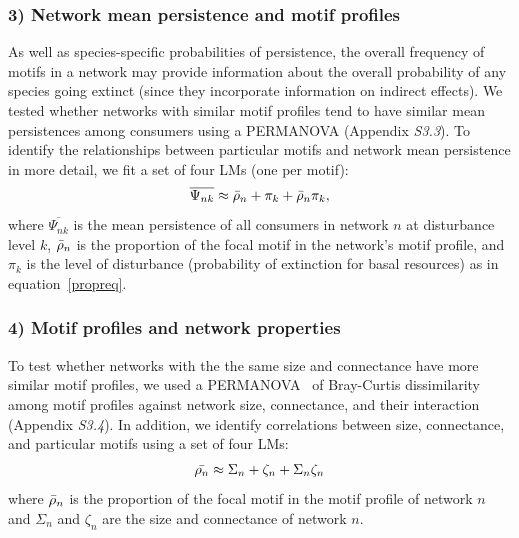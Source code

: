 \documentclass[12pt]{article}
\begin{document}
\begin{spacing}{2.0}
            
        \subsubsection*{3) Network mean persistence and motif profiles}

            As well as species-specific probabilities of persistence, the overall frequency of motifs in a network may provide information about the overall probability of any species going extinct (since they incorporate information on indirect effects).
            We tested whether networks with similar motif profiles tend to have similar mean persistences among consumers using a PERMANOVA (Appendix \emph{S3.3}).
            To identify the relationships between particular motifs and network mean persistence in more detail, we fit a set of four LMs (one per motif):
                \begin{equation}
                    \overline{\Psi_{nk}} \approx \Bar{\rho}_{n} + \pi_{k} + \Bar{\rho}_{n}\pi_{k},
                    \label{netpropeq}
                \end{equation}
            \noindent where $\overline{\Psi_{nk}}$ is the mean persistence of all consumers in network $n$ at disturbance level $k$, $\Bar{\rho}_{n}$ is the proportion of the focal motif in the network's motif profile, and $\pi_k$ is the level of disturbance (probability of extinction for basal resources) as in equation~\ref{propreq}.
                
        \subsubsection*{4) Motif profiles and network properties}
        
            To test whether networks with the the same size and connectance have more similar motif profiles, we used a PERMANOVA~\citep{Anderson2001} of Bray-Curtis dissimilarity among motif profiles against network size, connectance, and their interaction (Appendix \emph{S3.4}). 
            In addition, we identify correlations between size, connectance, and particular motifs using a set of four LMs:
            \begin{equation}
                \Bar{\rho_{n}} \approx \Sigma_{n} + \zeta_{n} + \Sigma_{n}\zeta_{n}
            \label{profile_global}
            \end{equation}
            \noindent where $\Bar{\rho}_{n}$ is the proportion of the focal motif in the motif profile of network $n$ and $\Sigma_n$ and $\zeta_{n}$ are the size and connectance of network $n$.
            

\end{spacing}
\end{document}
